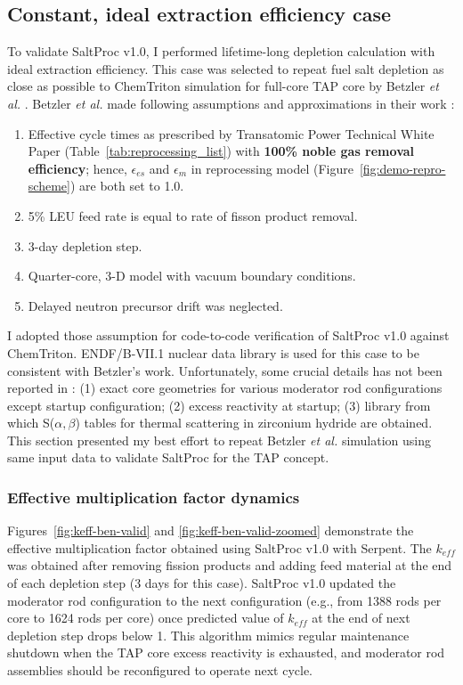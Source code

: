 \subsection{Constant, ideal extraction efficiency case}\label{sec:ben-valid}
To validate SaltProc v1.0, I performed lifetime-long depletion calculation 
with ideal extraction efficiency. This case was selected to repeat fuel salt 
depletion as close as possible to ChemTriton simulation for full-core 
\gls{TAP} core by Betzler \emph{et al.} \cite{betzler_assessment_2017-1}.  
Betzler \emph{et al.} made following assumptions and approximations in their 
work \cite{betzler_assessment_2017-1}:
\begin{enumerate}[noitemsep]	
	\item Effective cycle times as prescribed by Transatomic Power Technical 
	White Paper (Table~\ref{tab:reprocessing_list}) with \textbf{100\% noble 
	gas removal efficiency}; hence, $\epsilon_{es}$ and $\epsilon_m$ in 
	reprocessing model (Figure~\ref{fig:demo-repro-scheme}) are both set to 
	1.0.
	\item 5\% \gls{LEU} feed rate is equal to rate of fisson product removal.
	\item 3-day depletion step.
	\item Quarter-core, 3-D model with vacuum boundary conditions.
	\item Delayed neutron precursor drift was neglected.
\end{enumerate}
I adopted those assumption for code-to-code verification of SaltProc v1.0 
against ChemTriton. ENDF/B-VII.1 \cite{chadwick_endf/b-vii.1_2011} nuclear 
data library is used for this case to be consistent with Betzler's work.
Unfortunately, some crucial details has not been reported in 
\cite{betzler_assessment_2017-1}: (1) exact core geometries for various 
moderator rod configurations except startup configuration; (2) excess 
reactivity at startup; (3) library from which S($\alpha, \beta$) tables for 
thermal scattering in zirconium hydride are obtained. This section presented 
my best effort to repeat Betzler \emph{et al.} simulation using same input 
data to validate SaltProc for the \gls{TAP} concept.


\subsubsection{Effective multiplication factor dynamics}
Figures~\ref{fig:keff-ben-valid} and \ref{fig:keff-ben-valid-zoomed} 
demonstrate the effective multiplication factor obtained using SaltProc v1.0 
with Serpent. The $k_{eff}$ was obtained after removing fission products and 
adding feed material at the end of each depletion step (3 days for this case). 
SaltProc v1.0 updated the moderator rod configuration to the next 
configuration (e.g., from 1388 rods per core to 1624 rods per core) once 
predicted value of $k_{eff}$ at the end of next depletion step drops below 1. 
This algorithm mimics regular maintenance shutdown when the \gls{TAP} core 
excess reactivity is exhausted, and moderator rod assemblies should be 
reconfigured to operate next cycle. 

